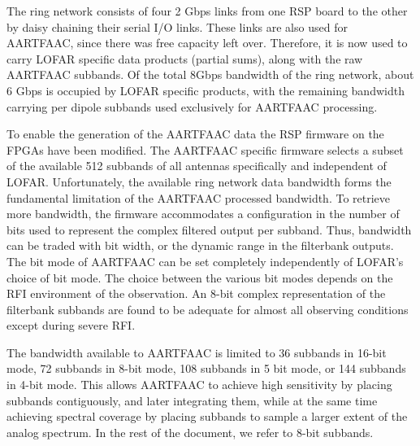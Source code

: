 \documentclass{ws-jai}
\begin{document}
The ring network consists  of four 2 Gbps links from one RSP  board to the other
by  daisy chaining  their  serial I/O  links.   These links  are  also used  for
AARTFAAC, since there was free capacity left over.  Therefore, it is now used to
carry LOFAR specific  data products (partial sums), along with  the raw AARTFAAC
subbands. Of  the total  8Gbps bandwidth of  the ring network,  about 6  Gbps is
occupied by LOFAR  specific products, with the remaining  bandwidth carrying per
dipole subbands used exclusively for AARTFAAC processing.


To enable the generation of the AARTFAAC data the RSP firmware on the FPGAs have
been modified. The AARTFAAC specific firmware  selects a subset of the available
512  subbands   of  all   antennas  specifically   and  independent   of  LOFAR.
Unfortunately, the available  ring network data bandwidth  forms the fundamental
limitation of the AARTFAAC processed bandwidth.  To retrieve more bandwidth, the
firmware accommodates  a configuration in the  number of bits used  to represent
the complex filtered output per subband.  Thus, bandwidth can be traded with bit
width, or the dynamic range in the filterbank outputs.  The bit mode of AARTFAAC
can be  set completely independently of  LOFAR's choice of bit  mode. The choice
between the various bit modes depends on the RFI environment of the observation.
An  8-bit complex  representation of  the filterbank  subbands are  found to  be
adequate for almost all observing conditions except during severe RFI.

The bandwidth available to AARTFAAC is limited to 36 subbands in 16-bit mode, 72
subbands in  8-bit mode, 108 subbands  in 5 bit  mode, or 144 subbands  in 4-bit
mode.  This allows  AARTFAAC to  achieve  high sensitivity  by placing  subbands
contiguously,  and later  integrating them,  while  at the  same time  achieving
spectral coverage  by placing subbands to  sample a larger extent  of the analog
spectrum. In the rest of the document, we refer to 8-bit subbands.\\
\end{document}
